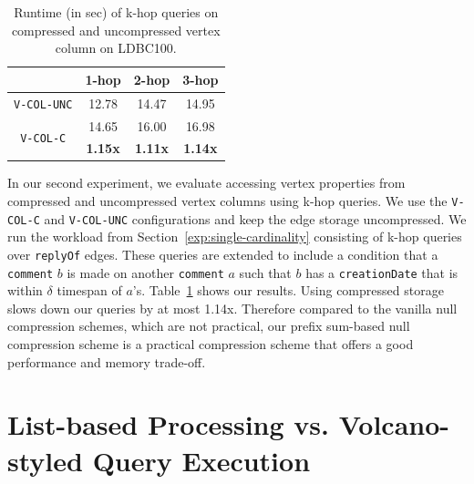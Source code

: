 \begin{table}
	\centering
	\bgroup
	\setlength{\tabcolsep}{8pt}
	\def\arraystretch{1.2}%
	\begin{tabular}{ |c|c|c|c| } 
		\hline
		& \textbf{1-hop} & \textbf{2-hop} & \textbf{3-hop} \\
		\hline \hline
		\texttt{V-COL-UNC}& 12.78 & 14.47 & 14.95\\ 
		\hline
		\multirow{2}{*}{\texttt{V-COL-C}}& 14.65 & 16.00 & 16.98 \\ 
		& \textbf{1.15x} & \textbf{1.11x} & \textbf{1.14x}\\ 
		\hline  
	\end{tabular}
	\egroup
	\captionsetup{justification=centering}
	\caption{Runtime (in sec) of k-hop queries on compressed and uncompressed vertex column on LDBC100.}
	\label{tbl:s3}
\end{table}

In our second experiment, we evaluate accessing vertex properties from compressed and uncompressed vertex columns using k-hop queries. We use the \texttt{V-COL-C} and \texttt{V-COL-UNC} configurations and keep the edge storage uncompressed. We run the workload from Section~\ref{exp:single-cardinality} consisting of k-hop queries over \texttt{replyOf} edges. These queries are extended to include a condition that a \texttt{comment} $b$ is made on another \texttt{comment} $a$ such that $b$ has a \texttt{creationDate} that is within $\delta$ timespan of $a$'s. Table~\ref{tbl:s3} shows our results. Using compressed storage slows down our queries by at most 1.14x. Therefore compared to the vanilla null compression schemes, which are not practical, our prefix sum-based null compression scheme is a practical compression scheme that offers a good performance and memory trade-off.

\section{List-based Processing vs. Volcano-styled Query Execution}
\label{exp:list-based}


